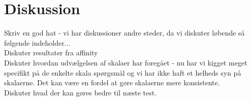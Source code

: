 \chapter{Diskussion}
\label{ParametreDiskussion}
%
Skriv en god hat - vi har diskussioner andre steder, da vi diskuter løbende så følgende indeholder...\\
Diskuter resultater fra affinity\\
Diskuter hvordan udvælgelsen af skalaer har foregået - nu har vi kigget meget specifikt på de enkelte skala spørgsmål og vi har ikke haft et helheds syn på skalaerne. Det kan være en fordel at gøre skalaerne mere konsistente. \\
Diskuter hvad der kan gøres bedre til næste test. \\